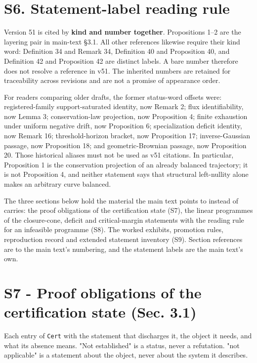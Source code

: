 \documentclass[11pt]{article}
\begin{document}
\section*{S6. Statement-label reading rule}\label{s6-statement-label-reading-rule}

Version 51 is cited by \textbf{kind and number together}. Propositions 1--2 are the layering pair in main-text \S3.1. All other references likewise require their kind word: Definition 34 and Remark 34, Definition 40 and Proposition 40, and Definition 42 and Proposition 42 are distinct labels. A bare number therefore does not resolve a reference in v51. The inherited numbers are retained for traceability across revisions and are not a promise of appearance order.

For readers comparing older drafts, the former status-word offsets were: registered-family support-saturated identity, now Remark 2; flux identifiability, now Lemma 3; conservation-law projection, now Proposition 4; finite exhaustion under uniform negative drift, now Proposition 6; specialization deficit identity, now Remark 16; threshold-horizon bracket, now Proposition 17; inverse-Gaussian passage, now Proposition 18; and geometric-Brownian passage, now Proposition 20. Those historical aliases must not be used as v51 citations. In particular, Proposition 1 is the conservation projection of an already balanced trajectory; it is not Proposition 4, and neither statement says that structural left-nullity alone makes an arbitrary curve balanced.

\vspace{0.8em}

The three sections below hold the material the main text points to instead of carries: the proof obligations of the certification state (S7), the linear programmes of the closure-cone, deficit and critical-margin statements with the reading rule for an infeasible programme (S8). The worked exhibits, promotion rules, reproduction record and extended statement inventory (S9). Section references are to the main text's numbering, and the statement labels are the main text's own.

\section*{S7 - Proof obligations of the certification state (Sec. 3.1)}\label{s7---proof-obligations-of-the-certification-state-sec-31}

Each entry of \texttt{Cert} with the statement that discharges it, the object it needs, and what its absence means. "Not established" is a status, never a refutation. "not applicable" is a statement about the object, never about the system it describes.
\end{document}
